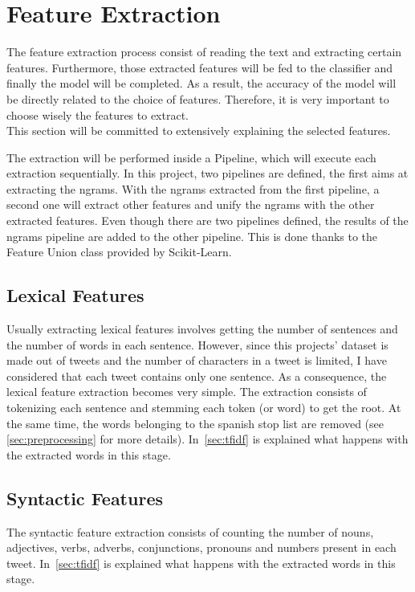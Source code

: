 \section{Feature Extraction}
\label{sec:feature}
 The feature extraction process consist of reading the text and extracting certain features. Furthermore, those extracted features will be fed to the classifier and finally the model will be completed. As a result, the accuracy of the model will be directly related to the choice of features. Therefore, it is very important to choose wisely the features to extract.\\
This section will be committed to extensively explaining the selected features.
\par
The extraction will be performed inside a Pipeline, which will execute each extraction sequentially. In this project, two pipelines are defined, the first aims at extracting the ngrams. With the ngrams extracted from the first pipeline, a second one will extract other features and unify the ngrams with the other extracted features. Even though there are two pipelines defined, the results of the ngrams pipeline are added to the other pipeline. This is done thanks to the Feature Union class provided by Scikit-Learn.
\subsection{Lexical Features}
Usually extracting lexical features involves getting the number of sentences and the number of words in each sentence. However, since this projects' dataset is made out of tweets and the number of characters in a tweet is limited, I have considered that each tweet contains only one sentence. As a consequence, the lexical feature extraction becomes very simple. The extraction consists of tokenizing each sentence and stemming each token (or word) to get the root. At the same time, the words belonging to the spanish stop list are removed (see \cref{sec:preprocessing} for more details). In~\cref{sec:tfidf} is explained what happens with the extracted words in this stage.
\subsection{Syntactic Features}
The syntactic feature extraction consists of counting the number of nouns, adjectives, verbs, adverbs, conjunctions, pronouns and numbers present in each tweet. In~\cref{sec:tfidf} is explained what happens with the extracted words in this stage.
